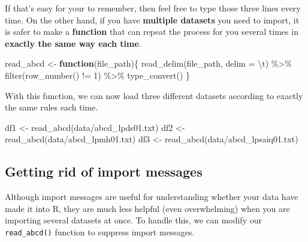 \documentclass[
]{book}
\newenvironment{Shaded}{\begin{snugshade}}{\end{snugshade}}
\newcommand{\AttributeTok}[1]{\textcolor[rgb]{0.77,0.63,0.00}{#1}}
\newcommand{\ControlFlowTok}[1]{\textcolor[rgb]{0.13,0.29,0.53}{\textbf{#1}}}
\newcommand{\DecValTok}[1]{\textcolor[rgb]{0.00,0.00,0.81}{#1}}
\newcommand{\FunctionTok}[1]{\textcolor[rgb]{0.00,0.00,0.00}{#1}}
\newcommand{\NormalTok}[1]{#1}
\newcommand{\OtherTok}[1]{\textcolor[rgb]{0.56,0.35,0.01}{#1}}
\newcommand{\SpecialCharTok}[1]{\textcolor[rgb]{0.00,0.00,0.00}{#1}}
\newcommand{\StringTok}[1]{\textcolor[rgb]{0.31,0.60,0.02}{#1}}
\begin{document}
If that's easy for your to remember, then feel free to type those three lines every time. On the other hand, if you have \textbf{multiple datasets} you need to import, it is safer to make a \textbf{function} that can repeat the process for you several times in \textbf{exactly the same way each time}.

\begin{Shaded}
\begin{Highlighting}[]
\NormalTok{read\_abcd }\OtherTok{\textless{}{-}} \ControlFlowTok{function}\NormalTok{(file\_path)\{}
  \FunctionTok{read\_delim}\NormalTok{(file\_path, }\AttributeTok{delim =} \StringTok{\textquotesingle{}}\SpecialCharTok{\textbackslash{}t}\StringTok{\textquotesingle{}}\NormalTok{) }\SpecialCharTok{\%\textgreater{}\%} 
    \FunctionTok{filter}\NormalTok{(}\FunctionTok{row\_number}\NormalTok{() }\SpecialCharTok{!=} \DecValTok{1}\NormalTok{) }\SpecialCharTok{\%\textgreater{}\%} 
    \FunctionTok{type\_convert}\NormalTok{()}
\NormalTok{\}}
\end{Highlighting}
\end{Shaded}

With this function, we can now load three different datasets according to exactly the same rules each time.

\begin{Shaded}
\begin{Highlighting}[]
\NormalTok{df1 }\OtherTok{\textless{}{-}} \FunctionTok{read\_abcd}\NormalTok{(}\StringTok{\textquotesingle{}data/abcd\_lpds01.txt\textquotesingle{}}\NormalTok{)}
\NormalTok{df2 }\OtherTok{\textless{}{-}} \FunctionTok{read\_abcd}\NormalTok{(}\StringTok{\textquotesingle{}data/abcd\_lpmh01.txt\textquotesingle{}}\NormalTok{)}
\NormalTok{df3 }\OtherTok{\textless{}{-}} \FunctionTok{read\_abcd}\NormalTok{(}\StringTok{\textquotesingle{}data/abcd\_lpsaiq01.txt\textquotesingle{}}\NormalTok{)}
\end{Highlighting}
\end{Shaded}

\hypertarget{getting-rid-of-import-messages}{%
\subsection{Getting rid of import messages}\label{getting-rid-of-import-messages}}

Although import messages are useful for understanding whether your data have made it into R, they are much less helpful (even overwhelming) when you are importing several datasets at once. To handle this, we can modify our \texttt{read\_abcd()} function to suppress import messages.
\end{document}

